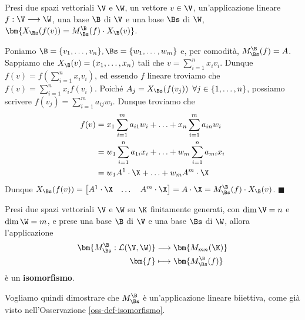 \documentclass[11pt, a4paper, titlepage, oneside]{scrbook}
\begin{document}
\begin{Proposizione}[]
\label{propos-matrice-associata-prodotto}
Presi due spazi vettoriali $\V$ e $\W$, un vettore $v \in \V$, un'applicazione lineare $f: \V \longrightarrow \W$, una base $\B$ di $\V$ e una base $\Bs$ di $\W$, $\bm{X_\Bs(f(v)) = M_\Bs^\B(f) \cdot X_\B(v)}$. 
\end{Proposizione}

\Dimostrazione \nopagebreak

Poniamo $\B = \{v_1, \ldots, v_n\}, \Bs = \{w_1, \ldots, w_m\}$ e, per comodità, $M_\Bs^\B(f) = A$. \\
Sappiamo che $X_\B(v) = (x_1, \ldots, x_n)$ tali che $v = \sum_{i = 1}^n x_i v_i$. Dunque $f(v) = f(\sum_{i = 1}^n x_i v_i)$, ed essendo $f$ lineare troviamo che $f(v) = \sum_{i = 1}^n x_i f(v_i)$. 
Poiché \mbox{$A_j = X_\Bs(f(v_j)) \enspace \forall j \in \{1, \ldots, n\}$}, possiamo scrivere $f(v_j) = \sum_{i = 1}^m a_{ij} w_i$. Dunque troviamo che
\begin{align*}
f(v) &= x_1 \sum_{i = 1}^m a_{i1} w_i + \ldots + x_n \sum_{i = 1}^m a_{in} w_i  \\
 &= w_1 \sum_{i = 1}^n a_{1i} x_i + \ldots + w_m \sum_{i = 1}^n a_{mi} x_i \\
 &= w_1 A^1 \cdot \X + \ldots + w_m A^m \cdot \X
\end{align*}
Dunque $X_\Bs(f(v)) = \begin{bmatrix}
    A^1 \cdot \X & \dots & A^m \cdot \X
\end{bmatrix} = A \cdot \X = M_\Bs^\B(f) \cdot X_\B(v)$. $\blacksquare$

\begin{Proposizione}[]
\label{propos-spaz-vet-app-lin-matrici}
Presi due spazi vettoriali $\V$ e $\W$ su $\K$ finitamente generati, con $\dim \V = n$ e $\dim \W = m$, e prese una base $\B$ di $\V$ e una base $\Bs$ di $\W$, allora l'applicazione
\begin{align*}
\bm{M_\Bs^\B: \mathcal{L(\V, \W)}} &\longrightarrow \bm{M_{mn}(\K)} \\
\bm{f} &\longmapsto \bm{M_\Bs^\B(f)}
\end{align*}
è un \textbf{isomorfismo}.
\end{Proposizione}

\Dimostrazione \nopagebreak

Vogliamo quindi dimostrare che $M_\Bs^\B$ è un'applicazione lineare biiettiva, come già visto nell'Osservazione \ref{oss-def-isomorfismo}.
\end{document}
